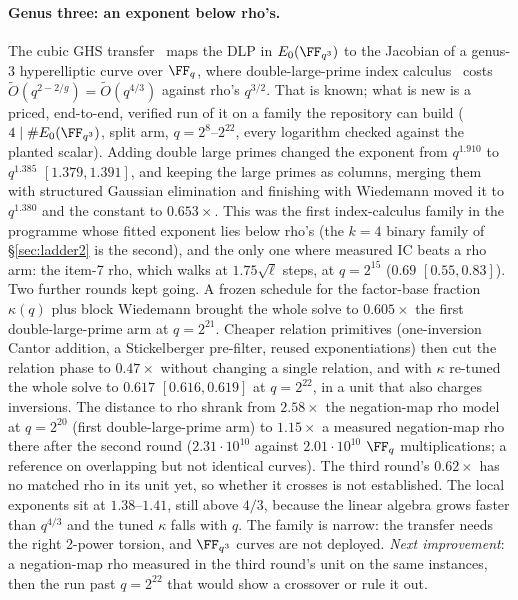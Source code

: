\paragraph{Genus three: an exponent below rho's.} The cubic GHS
transfer~\cite{ghs2002} maps the DLP in $E_0(\FF_{q^3})$ to the Jacobian
of a genus-3 hyperelliptic curve over $\FF_q$, where double-large-prime
index calculus~\cite{gtthd2007} costs $\tilde O(q^{2-2/g})=\tilde O(q^{4/3})$
against rho's $q^{3/2}$. That is known; what is new is a priced,
end-to-end, verified run of it on a family the repository can build
($4\mid\#E_0(\FF_{q^3})$, split arm, $q=2^{8}$--$2^{22}$, every logarithm checked
against the planted scalar). Adding double large primes changed the
exponent from $q^{1.910}$ to $q^{1.385}$ $[1.379,1.391]$, and keeping the large
primes as columns, merging them with structured Gaussian elimination and
finishing with Wiedemann moved it to $q^{1.380}$ and the constant to
$0.653\times$. This was the first index-calculus family in the programme whose fitted
exponent lies below rho's (the $k=4$ binary family of \S\ref{sec:ladder2}
is the second), and the only one where measured IC beats a rho arm: the item-7 rho, which walks at $1.75\sqrt\ell$ steps,
at $q=2^{15}$ ($0.69$ $[0.55,0.83]$). Two further
rounds kept going. A frozen schedule for the factor-base fraction $\kappa(q)$
plus block Wiedemann brought the whole solve to $0.605\times$ the first
double-large-prime arm at $q=2^{21}$. Cheaper relation primitives
(one-inversion Cantor addition, a Stickelberger pre-filter, reused
exponentiations) then cut the relation phase to $0.47\times$ without
changing a single relation, and with $\kappa$ re-tuned the whole solve to
$0.617$ $[0.616,0.619]$ at $q=2^{22}$, in a unit that also charges
inversions. The distance to rho shrank from $2.58\times$ the negation-map
rho model at $q=2^{20}$ (first double-large-prime arm) to $1.15\times$ a
measured negation-map rho there after the second round ($2.31\cdot10^{10}$
against $2.01\cdot10^{10}$ $\FF_q$ multiplications; a reference on
overlapping but not identical curves). The third round's $0.62\times$
has no matched rho in its unit yet, so whether it crosses is not
established. The local exponents sit at $1.38$--$1.41$, still above $4/3$,
because the linear algebra grows faster than $q^{4/3}$ and the tuned
$\kappa$ falls with $q$. The family is narrow: the transfer needs the
right 2-power torsion, and $\FF_{q^3}$ curves are not deployed.
\emph{Next improvement}: a negation-map rho measured in the third round's
unit on the same instances, then the run past $q=2^{22}$ that would show a
crossover or rule it out.

